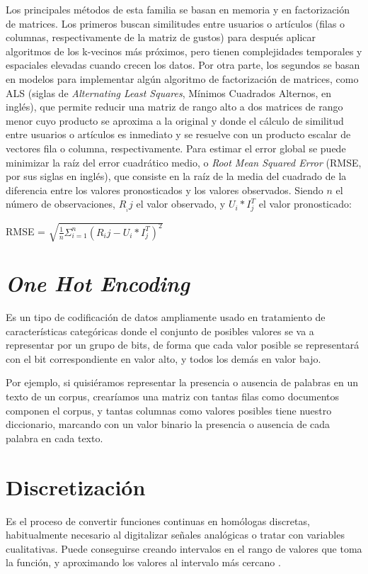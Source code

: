 Los principales métodos de esta familia se basan en memoria y en factorización de matrices. Los primeros buscan similitudes entre usuarios o artículos (filas o columnas, respectivamente de la matriz de gustos) para después aplicar algoritmos de los k-vecinos más próximos, pero tienen complejidades temporales y espaciales elevadas cuando crecen los datos. Por otra parte, los segundos se basan en modelos para implementar algún algoritmo de factorización de matrices, como ALS (siglas de \textit{Alternating Least Squares}, Mínimos Cuadrados Alternos, en inglés), que permite reducir una matriz de rango alto a dos matrices de rango menor cuyo producto se aproxima a la original y donde el cálculo de similitud entre usuarios o artículos es inmediato y se resuelve con un producto escalar de vectores fila o columna, respectivamente. Para estimar el error global se puede minimizar la raíz del error cuadrático medio, o \textit{Root Mean Squared Error} (RMSE, por sus siglas en inglés), que consiste en la raíz de la media del cuadrado de la diferencia entre los valores pronosticados y los valores observados. Siendo $n$ el número de observaciones, $R__ij$ el valor observado, y $U_i * I_j^T$ el valor pronosticado:

RMSE = $\sqrt{\frac{1}{n}\Sigma_{i=1}^{n}{(R_ij - U_i * I_j^T)}^2}$

\section{\textit{One Hot Encoding}}

Es un tipo de codificación de datos ampliamente usado en tratamiento de características categóricas donde el conjunto de posibles valores se va a representar por un grupo de bits, de forma que cada valor posible se representará con el bit correspondiente en valor alto, y todos los demás en valor bajo.

Por ejemplo, si quisiéramos representar la presencia o ausencia de palabras en un texto de un corpus, crearíamos una matriz con tantas filas como documentos componen el corpus, y tantas columnas como valores posibles tiene nuestro diccionario, marcando con un valor binario la presencia o ausencia de cada palabra en cada texto.

\section{Discretización}

Es el proceso de convertir funciones continuas en homólogas discretas, habitualmente necesario al digitalizar señales analógicas o tratar con variables cualitativas. Puede conseguirse creando intervalos en el rango de valores que toma la función, y aproximando los valores al intervalo más cercano \cite{discretizacion}.


